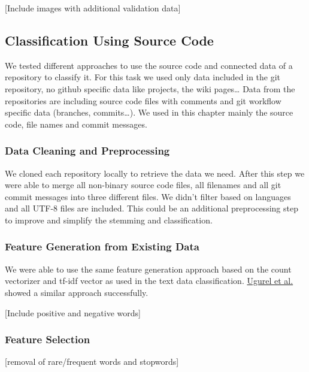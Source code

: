 \documentclass{article}
\begin{document}
{[}Include images with additional validation data{]}

\subsection{Classification Using Source
Code}\label{classification-using-source-code}

We tested different approaches to use the source code and connected data
of a repository to classify it. For this task we used only data included
in the git repository, no github specific data like projects, the wiki
pages\ldots{} Data from the repositories are including source code files
with comments and git workflow specific data (branches,
commits\ldots{}). We used in this chapter mainly the source code, file
names and commit messages.

\subsubsection{Data Cleaning and
Preprocessing}\label{data-cleaning-and-preprocessing-2}

We cloned each repository locally to retrieve the data we need. After
this step we were able to merge all non-binary source code files, all
filenames and all git commit messages into three different files. We
didn't filter based on languages and all UTF-8 files are included. This
could be an additional preprocessing step to improve and simplify the
stemming and classification.

\subsubsection{Feature Generation from Existing
Data}\label{feature-generation-from-existing-data-1}

We were able to use the same feature generation approach based on the
count vectorizer and tf-idf vector as used in the text data
classification.
\href{https://clgiles.ist.psu.edu/papers/KDD-2002-whatsthecode.pdf}{Ugurel
et al.} showed a similar approach successfully.

[Include positive and negative words]

\subsubsection{Feature Selection}\label{feature-selection-2}

{[}removal of rare/frequent words and stopwords{]}
\end{document}

